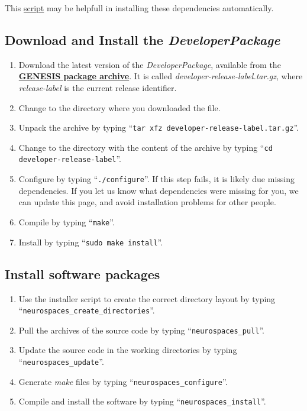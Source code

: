 \documentclass[12pt]{article}
\begin{document}
This \href{scripts/install-dependencies.sh}{script} may be helpfull in installing these dependencies automatically.


\subsection*{Download and Install the {\it DeveloperPackage}}

\begin{enumerate}
   \item Download the latest version of the {\it DeveloperPackage}, available from the \href{http://repo-genesis3.cbi.utsa.edu/src/}{\bf GENESIS package archive}. It is called {\it developer-release-label.tar.gz}, where {\it release-label} is the current release identifier.
   \item Change to the directory where you downloaded the file.
   \item Unpack the archive by typing ``{\tt tar xfz developer-release-label.tar.gz}''.
   \item Change to the directory with the content of the archive by typing ``{\tt cd developer-release-label}''.
   \item Configure by typing ``{\tt ./configure}''.  If this step fails, it is likely due missing dependencies.  If you let us know what dependencies were missing for you, we can update this page, and avoid installation problems for other people.
   \item Compile by typing ``{\tt make}''.
   \item Install by typing ``{\tt sudo make install}''. 
\end{enumerate}

\subsection*{Install software packages}

\begin{enumerate}
   \item Use the installer script to create the correct directory layout by typing ``{\tt neurospaces\_create\_directories}''.
   \item Pull the archives of the source code by typing ``{\tt neurospaces\_pull}''.
   \item Update the source code in the working directories by typing ``{\tt neurospaces\_update}''.
   \item Generate {\it make} files by typing ``{\tt neurospaces\_configure}''.
   \item Compile and install the software by typing ``{\tt neurospaces\_install}''.
\end{enumerate}
\end{document}
